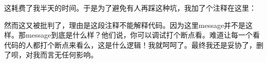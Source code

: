 \documentclass[12pt]{article}
\begin{document}
\begin{Shaded}
\begin{Highlighting}[]
\OperatorTok{\{}\OperatorTok{:\{}\OperatorTok{:}\OperatorTok{,}\OperatorTok{:}\OperatorTok{\}\}}
\end{Highlighting}
\end{Shaded}

这耗费了我半天的时间。于是为了避免有人再踩这种坑，我加了个注释在这里：

\begin{Shaded}
\begin{Highlighting}[]
\OperatorTok{(}\OperatorTok{)} \OperatorTok{\{}
     \OperatorTok{\{}
        \CommentTok{/**}
         \CommentTok{*}\CommentTok{:}
         \CommentTok{*} 
         \CommentTok{*/}
        \OperatorTok{=}\OperatorTok{(}\OperatorTok{);}
\end{Highlighting}
\end{Shaded}

然而这又被批判了，理由是这段注释不能解释代码。因为这里message并不是这样。那message到底是什么样？他们说，你可以调试打个断点看。难道让每一个看代码的人都打个断点来看么，这是什么逻辑！我就呵呵了。最终我还是妥协了，删了呗，对我而言无任何影响。
\end{document}
